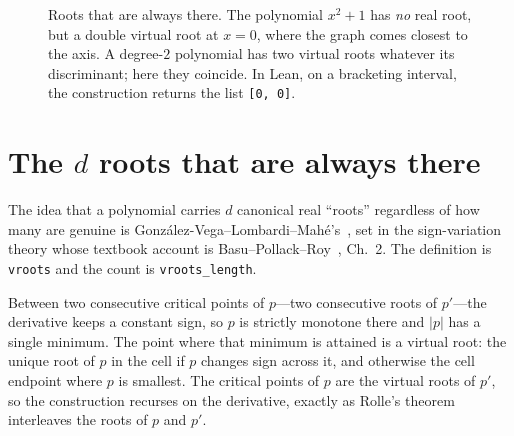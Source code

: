 \documentclass[11pt]{article}
\newcommand{\lean}[1]{\texttt{#1}}
\begin{document}
\begin{figure}[htbp]
\centering
{}
\caption{Roots that are always there. The polynomial $x^2+1$ has \emph{no} real root, but a double
virtual root at $x=0$, where the graph comes closest to the axis. A degree-$2$ polynomial has two
virtual roots whatever its discriminant; here they coincide. In Lean, on a bracketing interval, the
construction returns the list \lean{[0,\,0]}.}
\label{fig:fillin}
\end{figure}

\section{The \texorpdfstring{$d$}{d} roots that are always there}\label{sec:q1}

The idea that a polynomial carries $d$ canonical real ``roots'' regardless of how many are genuine is
Gonz\'alez-Vega--Lombardi--Mah\'e's~\cite{glm}, set in the sign-variation theory whose textbook account
is Basu--Pollack--Roy~\cite{bpr}, Ch.~2. The definition is \lean{vroots} and the count is
\lean{vroots\_length}.

Between two consecutive critical points of $p$---two consecutive roots
of $p'$---the derivative keeps a constant sign, so $p$ is strictly monotone there and $|p|$ has a
single minimum. The point where that minimum is attained is a virtual root: the unique root of $p$ in
the cell if $p$ changes sign across it, and otherwise the cell endpoint where $p$ is smallest. The
critical points of $p$ are the virtual roots of $p'$, so the construction recurses on the derivative,
exactly as Rolle's theorem~\cite{rolle} interleaves the roots of $p$ and $p'$.
\end{document}

